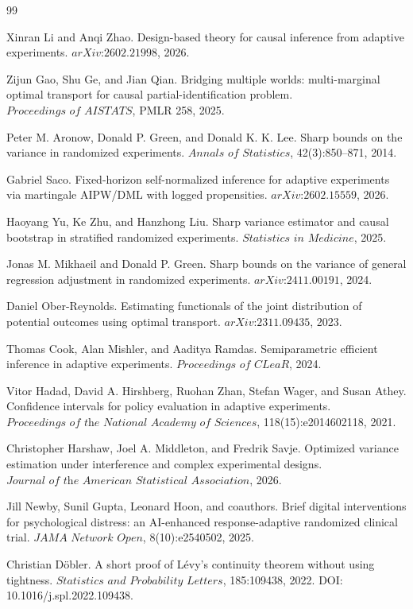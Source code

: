 \documentclass{article}
\begin{document}
\begin{thebibliography}{99}

   Xinran Li and Anqi Zhao. Design-based theory for causal inference from adaptive experiments. \(\textit{arXiv:2602.21998}\), 2026.

   Zijun Gao, Shu Ge, and Jian Qian. Bridging multiple worlds: multi-marginal optimal transport for causal partial-identification problem. \(\textit{Proceedings of AISTATS}\), PMLR 258, 2025.

   Peter M. Aronow, Donald P. Green, and Donald K. K. Lee. Sharp bounds on the variance in randomized experiments. \(\textit{Annals of Statistics}\), 42(3):850--871, 2014.

   Gabriel Saco. Fixed-horizon self-normalized inference for adaptive experiments via martingale AIPW/DML with logged propensities. \(\textit{arXiv:2602.15559}\), 2026.

   Haoyang Yu, Ke Zhu, and Hanzhong Liu. Sharp variance estimator and causal bootstrap in stratified randomized experiments. \(\textit{Statistics in Medicine}\), 2025.

   Jonas M. Mikhaeil and Donald P. Green. Sharp bounds on the variance of general regression adjustment in randomized experiments. \(\textit{arXiv:2411.00191}\), 2024.

   Daniel Ober-Reynolds. Estimating functionals of the joint distribution of potential outcomes using optimal transport. \(\textit{arXiv:2311.09435}\), 2023.

   Thomas Cook, Alan Mishler, and Aaditya Ramdas. Semiparametric efficient inference in adaptive experiments. \(\textit{Proceedings of CLeaR}\), 2024.

   Vitor Hadad, David A. Hirshberg, Ruohan Zhan, Stefan Wager, and Susan Athey. Confidence intervals for policy evaluation in adaptive experiments. \(\textit{Proceedings of the National Academy of Sciences}\), 118(15):e2014602118, 2021.

   Christopher Harshaw, Joel A. Middleton, and Fredrik Savje. Optimized variance estimation under interference and complex experimental designs. \(\textit{Journal of the American Statistical Association}\), 2026.

   Jill Newby, Sunil Gupta, Leonard Hoon, and coauthors. Brief digital interventions for psychological distress: an AI-enhanced response-adaptive randomized clinical trial. \(\textit{JAMA Network Open}\), 8(10):e2540502, 2025.

   Christian Döbler. A short proof of Lévy's continuity theorem without using tightness. \(\textit{Statistics and Probability Letters}\), 185:109438, 2022. DOI: 10.1016/j.spl.2022.109438.

\end{thebibliography}
\end{document}
